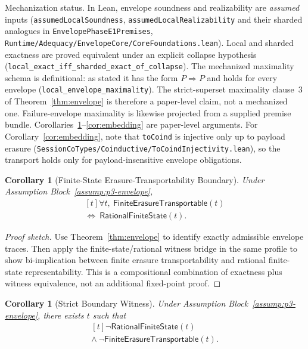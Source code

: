 \documentclass[a4paper,10pt,twocolumn,english]{article}
\numberwithin{equation}{section}
\theoremstyle{paperdef}
\theoremstyle{paperplain}
\newtheorem{corollary}[definition]{Corollary}
\theoremstyle{paperdef}
\theoremstyle{paperremark}
\theoremstyle{paperdef}
\begin{document}
Mechanization status. In Lean, envelope soundness and realizability are
\emph{assumed} inputs (\texttt{assumedLocalSoundness},
\texttt{assumedLocalRealizability} and their sharded analogues in
\texttt{EnvelopePhaseE1Premises},
\texttt{Runtime/\allowbreak Adequacy/\allowbreak EnvelopeCore/\allowbreak CoreFoundations.lean}).
Local and sharded exactness are proved equivalent under an explicit collapse
hypothesis (\nolinkurl{local_exact_iff_sharded_exact_of_collapse}). The mechanized maximality
schema is definitional: as stated it has the form $P\Rightarrow P$ and holds for
every envelope (\nolinkurl{local_envelope_maximality}). The strict-superset
maximality clause~3 of Theorem~\ref{thm:envelope} is therefore a paper-level
claim, not a mechanized one. Failure-envelope maximality is likewise projected from a
supplied premise bundle.
Corollaries~\ref{cor:transportability}--\ref{cor:embedding} are paper-level
arguments. For Corollary~\ref{cor:embedding}, note that \texttt{toCoind} is
injective only up to payload erasure
(\texttt{SessionCoTypes/\allowbreak Coinductive/\allowbreak ToCoindInjectivity.lean}), so the
transport holds only for payload-insensitive envelope obligations.

\begin{corollary}[Finite-State Erasure-Transportability Boundary]
	\label{cor:transportability}
	Under Assumption Block~\ref{assump:p3-envelope},
	\begin{equation}
		\begin{aligned}[t]
			\forall t,\ \mathsf{FiniteErasureTransportable}(t)
			\\
			\iff\ \mathsf{RationalFiniteState}(t).
		\end{aligned}
	\end{equation}
\end{corollary}

\begin{proof}[Proof sketch]
	Use Theorem~\ref{thm:envelope} to identify exactly admissible envelope traces.
	Then apply the finite-state/rational witness bridge in the same profile to show
	bi-implication between finite erasure transportability and rational finite-state
	representability. This is a compositional combination of exactness plus witness
	equivalence, not an additional fixed-point proof.
\end{proof}

\begin{corollary}[Strict Boundary Witness]
	\label{cor:boundary}
	Under Assumption Block~\ref{assump:p3-envelope}, there exists $t$ such that
	\begin{equation}
		\begin{aligned}[t]
			\neg \mathsf{RationalFiniteState}(t)
			\\
			\land\ \neg \mathsf{FiniteErasureTransportable}(t).
		\end{aligned}
	\end{equation}
\end{corollary}
\end{document}
